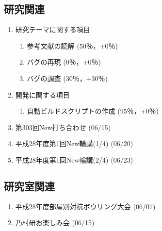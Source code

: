 \documentclass[fleqn, 12pt]{extarticle}
\begin{document}
    \subsection{研究関連}
    \label{sec-2-1}
    \begin{enumerate}

        \item 研究テーマに関する項目
            \hfill
            \label{enum-research1}
            \begin{enumerate}

                \item 参考文献の読解
                    \hfill
                    \label{enum-1-A}
                    (50％，+0％)

                \item バグの再現
                    \hfill
                    \label{enum-1-B}
                    (0％，+0％)

                \item バグの調査
                    \hfill
                    \label{enum-1-B}
                    (30％，+30％)

            \end{enumerate}

        \item 開発に関する項目
            \hfill
            \label{enum-research2}
            \begin{enumerate}

                \item 自動ビルドスクリプトの作成
                    \hfill
                    \label{enum-2-A}
                    (95％，+0％)

            \end{enumerate}

        \item 第303回New打ち合わせ
            \hfill
            \label{enum-research3}
            (06/15)

        \item 平成28年度第1回New輪講(1/4)
            \hfill
            \label{enum-research4}
            (06/20)

        \item 平成28年度第1回New輪講(2/4)
            \hfill
            \label{enum-research5}
            (06/23)

    \end{enumerate}
    \subsection{研究室関連}
    \label{sec-2-2}
    \begin{enumerate}

        \item 平成28年度部屋別対抗ボウリング大会
            \hfill
            \label{enum-18}
            (06/07)

        \item 乃村研お楽しみ会
            \hfill
            \label{enum-18}
            (06/15)

    \end{enumerate}
\end{document}

